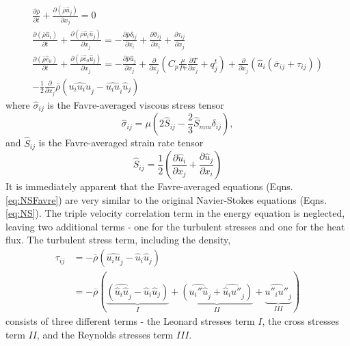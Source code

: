\begin{equation} 
  \label{eq:NSFavre}
  \begin{gathered}
    \frac{\partial \overline{\rho}}{\partial t} + \frac{\partial \left(\overline{\rho} \hat{u}_j \right)}{\partial x_j} = 0 \\
    \frac{\partial \left( \overline{\rho} \hat{u}_i \right)}{\partial t} + \frac{\partial\left(\overline{\rho} \hat{u}_i \hat{u}_j \right)}{\partial x_j} = -\frac{\partial \overline{p}\delta _{ij}}{\partial x_i} + \frac{\partial \hat{\sigma} _{ij}}{\partial x_i}+\frac{\partial \tau _{ij}}{\partial x_j} \\
    \frac{\partial \left( \overline{\rho} \hat{e}_0\right)}{\partial t} + \frac{\partial \left(\overline{\rho} \hat{e}_0 \hat{u}_j\right)}{\partial x_j}= -\frac{\partial \overline{p}\hat{u}_j}{\partial x_j}+\frac{\partial}{\partial x_j}\left(C_p\frac{\mu}{Pr}\frac{\partial {T}}{\partial x_j}+q_j^t\right)+\frac{\partial}{\partial x_j}\left(\hat{u}_i\left(\overline{\sigma} _{ij} + \tau_{ij}\right)\right)\\
    -\frac{1}{2}\frac{\partial}{\partial x_j}\overline{\rho}\left(\widehat{u_iu_iu}_j-\widehat{u_iu}_i\hat{u}_j\right)
  \end{gathered}
\end{equation}
where $\hat{\sigma} _{ij}$ is the Favre-averaged viscous stress tensor
\begin{equation}
  \hat{\sigma} _{ij} = \mu \left(2\hat{S}_{ij}-\frac{2}{3}\hat{S}_{mm}\delta _{ij}\right),
\end{equation}
and $\hat{S}_{ij}$ is the Favre-averaged strain rate tensor
\begin{equation}
  \hat{S}_{ij}=\frac{1}{2}\left(\frac{\partial \hat{u}_i}{\partial x_j}+\frac{\partial \hat{u}_j}{\partial x_i}\right)
\end{equation}
It is immediately apparent that the Favre-averaged equations (Eqns. \ref{eq:NSFavre}) are very similar to the original Navier-Stokes equations (Eqns. \ref{eq:NS}). The triple velocity correlation term in the energy equation is neglected, leaving two additional terms - one for the turbulent stresses and one for the heat flux. The turbulent stress term, including the density, 
\begin{equation}
  \begin{aligned}
    \tau _{ij}  &= -\overline{\rho}\left(\widehat{u_iu}_j-\hat{u}_i\hat{u}_j\right)\\
                &= -\overline{\rho}\left(\underbrace{\left(\widehat{\hat{u}_i\hat{u}}_j-\hat{u}_i\hat{u}_j\right)}_I+\underbrace{\left(\widehat{u_i''\hat{u}}_j+\widehat{\hat{u}_iu''}_j\right)}_{II}+\underbrace{\widehat{u''_iu''}_j}_{III}\right)
  \end{aligned}
\end{equation}
consists of three different terms - the Leonard stresses term $I$, the cross stresses term $II$, and the Reynolds stresses term $III$. 

